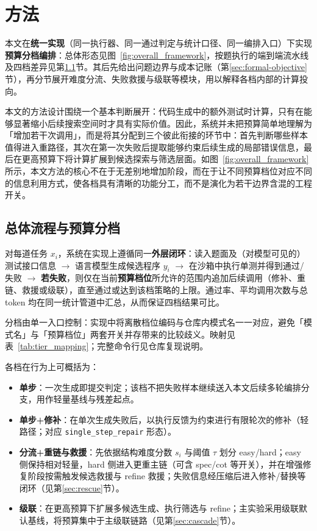 \section{方法}

本文在\textbf{统一实现}（同一执行器、同一通过判定与统计口径、同一编排入口）下实现\textbf{预算分档编排}：总体形态见图~\ref{fig:overall_framework}，按题执行的端到端流水线及四档差异见第\ref{sec:overview-flow}节。其后先给出问题边界与成本记账（第\ref{sec:formal-objective}节），再分节展开难度分流、失败救援与级联等模块，用以解释各档内部的计算投向。

本文的方法设计围绕一个基本判断展开：代码生成中的额外测试时计算，只有在能够显著缩小后续搜索空间时才具有实际价值\cite{chen2024selfdebug,shinn2023reflexion,gou2024critic,li2025sstar}。因此，系统并未把预算简单地理解为「增加若干次调用」，而是将其分配到三个彼此衔接的环节中：首先判断哪些样本值得进入重路径，其次在第一次失败后提取能够约束后续生成的局部错误信息，最后在更高预算下将计算扩展到候选探索与筛选层面。如图~\ref{fig:overall_framework} 所示，本文方法的核心不在于无差别地增加阶段，而在于让不同预算档位对应不同的信息利用方式，使各档具有清晰的功能分工，而不是演化为若干边界含混的工程开关。



\subsection{总体流程与预算分档}
\label{sec:overview-flow}

对每道任务 $x_i$，系统在实现上遵循同一\textbf{外层闭环}：读入题面及（对模型可见的）测试接口信息 $\rightarrow$ 语言模型生成候选程序 $y_i$ $\rightarrow$ 在沙箱中执行单测并得到通过/失败 $\rightarrow$ \textbf{若失败}，则仅在当前\textbf{预算档位}所允许的范围内追加后续调用（修补、重链、救援或级联），直至通过或达到该档策略的上限。通过率、平均调用次数与总 token 均在同一统计管道中汇总，从而保证四档结果可比。

分档由单一入口控制：实现中将离散档位编码与仓库内模式名一一对应，避免「模式名」与「预算档位」两套开关并存带来的比较歧义。映射见表~\ref{tab:tier_mapping}；完整命令行见仓库复现说明。

各档在行为上可概括为：
\begin{itemize}
\item \textbf{单步}：一次生成即提交判定；该档不把失败样本继续送入本文后续多轮编排分支，用作轻量基线与残差起点。
\item \textbf{单步+修补}：在单次生成失败后，以执行反馈为约束进行有限轮次的修补（轻路径；对应 \texttt{single\_step\_repair} 形态）。
\item \textbf{分流+重链与救援}：先依据结构难度分数 $s_i$ 与阈值 $\tau$ 划分 easy/hard；easy 侧保持相对轻量，hard 侧进入更重主链（可含 spec/cot 等开关），并在增强修复阶段按需触发候选救援与 refine 救援；失败信息经压缩后进入修补/替换等闭环（见第\ref{sec:rescue}节）。
\item \textbf{级联}：在更高预算下扩展多候选生成、执行筛选与 refine；主实验采用级联默认基线，将预算集中于主级联链路（见第\ref{sec:cascade}节）。
\end{itemize}

